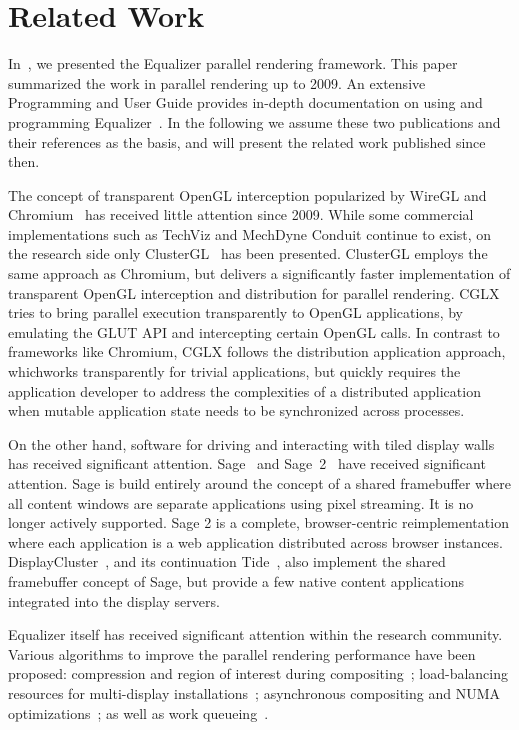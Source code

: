 \documentclass[10pt,journal,compsoc]{IEEEtran}
\begin{document}
\section{Related Work}\label{sec:related}

In~\cite{EMP:09}, we presented the Equalizer parallel rendering framework. This
paper summarized the work in parallel rendering up to 2009. An extensive
Programming and User Guide provides in-depth documentation on using and
programming Equalizer~\cite{Eilemann:13}. In the following we assume these two
publications and their references as the basis, and will present the related
work published since then.

The concept of transparent OpenGL interception popularized by WireGL and
Chromium~\cite{HHNFAKK:02} has received little attention since 2009. While some
commercial implementations such as TechViz and MechDyne Conduit continue to
exist, on the research side only ClusterGL~\cite{NHM:11} has been
presented. ClusterGL employs the same approach as Chromium, but delivers a
significantly faster implementation of transparent OpenGL interception and
distribution for parallel rendering. CGLX~\cite{DK:11} tries to bring parallel
execution transparently to OpenGL applications, by emulating the GLUT API and
intercepting certain OpenGL calls. In contrast to frameworks like Chromium, CGLX
follows the distribution application approach, whichworks transparently for
trivial applications, but quickly requires the application developer to address
the complexities of a distributed application when mutable application state
needs to be synchronized across processes.

On the other hand, software for driving and interacting with tiled display walls
has received significant attention. Sage~\cite{Sage} and Sage~2~\cite{Sage2}
have received significant attention. Sage is build entirely around the concept
of a shared framebuffer where all content windows are separate applications
using pixel streaming. It is no longer actively supported. Sage 2 is a complete,
browser-centric reimplementation where each application is a web application
distributed across browser instances. DisplayCluster~\cite{DC}, and its
continuation Tide~\cite{tide}, also implement the shared framebuffer concept of
Sage, but provide a few native content applications integrated into the display
servers.

Equalizer itself has received significant attention within the research
community. Various algorithms to improve the parallel rendering performance have
been proposed: compression and region of interest during
compositing~\cite{MEP:10}; load-balancing resources for multi-display
installations~\cite{EEP:11}; asynchronous compositing and NUMA
optimizations~\cite{EBAHMP:12}; as well as work queueing~\cite{SPEP:16}.
\end{document}
